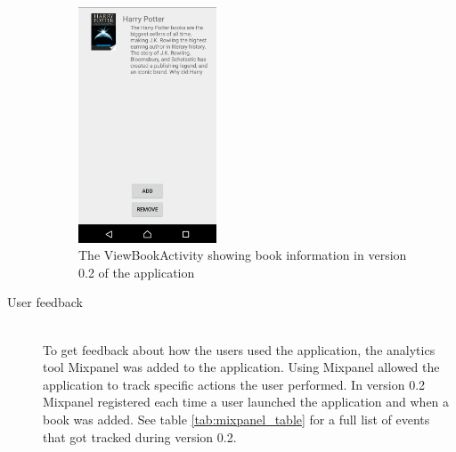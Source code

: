 \begin{description}
\begin{figure}
\centering
\includegraphics[height=7cm]{figs/v02/bookView02.png}
\caption{The ViewBookActivity showing book information in version 0.2 of the application}
\label{fig:book-view-v2}
\end{figure}

\item[User feedback] \hfill\\
To get feedback about how the users used the application, the analytics tool Mixpanel\cite{mixpanel} was added to the application. Using Mixpanel allowed the application to track specific actions the user performed. In version 0.2 Mixpanel registered each time a user launched the application and when a book was added. See table \ref{tab:mixpanel_table} for a full list of events that got tracked during version 0.2.
\end{description}

